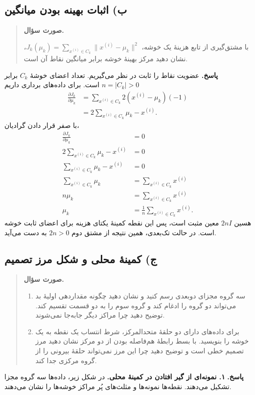 \documentclass{article}
\numberwithin{equation}{section}
\numberwithin{table}{section}
\newenvironment{questionprompt}{%
    \begin{quote}\noindent\textbf{صورت سؤال.}\enspace\ignorespaces
}{%
    \end{quote}\noindent\textbf{پاسخ.}\enspace\ignorespacesafterend
}
\begin{document}
\subsection*{ب) اثبات بهینه بودن میانگین}
\begin{questionprompt}
    با مشتق‌گیری از تابع هزینهٔ یک خوشه،
    \(J_k(\mu_k)=\sum_{x^{(i)}\in C_k}\lVert x^{(i)}-\mu_k\rVert^2\)،
    نشان دهید مرکز بهینهٔ خوشه برابر میانگین نقاط آن است.
\end{questionprompt}
عضویت نقاط را ثابت در نظر می‌گیریم. تعداد اعضای خوشهٔ \(C_k\) برابر \(n=|C_k|>0\) است. برای داده‌های برداری داریم
\begin{align*}
    \frac{\partial J_k}{\partial\mu_k}
    &=\sum_{x^{(i)}\in C_k}2(x^{(i)}-\mu_k)(-1)\\
    &=2\sum_{x^{(i)}\in C_k}\mu_k-x^{(i)}.
\end{align*}
با صفر قرار دادن گرادیان،
\begin{align*}
    \frac{\partial J_k}{\partial\mu_k}
    &=0\\
    2\sum_{x^{(i)}\in C_k}\mu_k-x^{(i)}
    &=0\\
    \sum_{x^{(i)}\in C_k}\mu_k-x^{(i)}
    &=0\\
    \sum_{x^{(i)}\in C_k}\mu_k
    &=\sum_{x^{(i)}\in C_k}x^{(i)}\\
    n\mu_k
    &=\sum_{x^{(i)}\in C_k}x^{(i)}\\
    \mu_k
    &=\frac{1}{n}\sum_{x^{(i)}\in C_k}x^{(i)}.
\end{align*}
هسین \(2nI\) معین مثبت است، پس این نقطه کمینهٔ یکتای هزینه برای اعضای ثابت خوشه است. در حالت تک‌بعدی، همین نتیجه از مشتق دوم \(2n>0\) به دست می‌آید.

\subsection*{ج) کمینهٔ محلی و شکل مرز تصمیم}
\begin{questionprompt}
    \begin{enumerate}
        \item سه گروه مجزای دوبعدی رسم کنید و نشان دهید چگونه مقداردهی اولیهٔ بد می‌تواند دو گروه را ادغام کند و گروه سوم را به دو قسمت تقسیم کند. توضیح دهید چرا مراکز دیگر جابه‌جا نمی‌شوند.
        \item برای داده‌های دارای دو حلقهٔ متحدالمرکز، شرط انتساب یک نقطه به یک خوشه را بنویسید. با بسط رابطهٔ هم‌فاصله بودن از دو مرکز نشان دهید مرز تصمیم خطی است و توضیح دهید چرا این مرز نمی‌تواند حلقهٔ بیرونی را از گروه مرکزی جدا کند.
    \end{enumerate}
\end{questionprompt}
\textbf{۱. نمونه‌ای از گیر افتادن در کمینهٔ محلی.}
در شکل زیر، داده‌ها سه گروه مجزا تشکیل می‌دهند. نقطه‌ها نمونه‌ها و مثلث‌های پُر مراکز خوشه‌ها را نشان می‌دهند.
\end{document}
